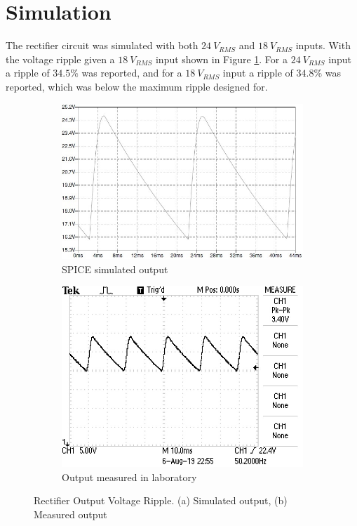 \section{Simulation} \label{sec:simulation_rectifier}
The rectifier circuit was simulated with both $\SI{24}{V_{RMS}}$ and $\SI{18}{V_{RMS}}$ inputs. With the voltage ripple given a $\SI{18}{V_{RMS}}$ input shown in Figure \ref{subfig:18Vsim}. For a $\SI{24}{V_{RMS}}$ input a ripple of $34.5\%$ was reported, and for a $\SI{18}{V_{RMS}}$ input a ripple of $34.8\%$ was reported, which was below the maximum ripple designed for. 

\begin{figure}
 \centering
     \begin{subfigure}[]{0.45\textwidth}
        \centering
         \includegraphics[width=1\linewidth]{./Figures/rectifier18vplot.jpg}
		    \caption{SPICE simulated output} \label{subfig:18Vsim}
     \end{subfigure}
      \begin{subfigure}[]{0.45\textwidth}
              \centering
\includegraphics[width=1\linewidth]{./Figures/rectifier18vmeas.JPG}
		    \caption{Output measured in laboratory}  \label{subfig:18Vmeas}
     \end{subfigure}
   \caption[Rectifier Output Voltage Ripple]{Rectifier Output Voltage Ripple. (a) Simulated output, (b) Measured output}
    \label{fig:regulator_simulation_results_box}
 \end{figure}

